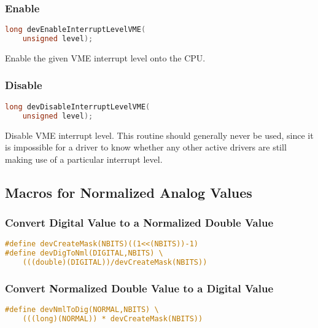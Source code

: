 \subsubsection{Enable}

\begin{lstlisting}[language=C]
long devEnableInterruptLevelVME(
    unsigned level);
\end{lstlisting}

Enable the given VME interrupt level onto the CPU.

\subsubsection{Disable}

\begin{lstlisting}[language=C]
long devDisableInterruptLevelVME(
    unsigned level);
\end{lstlisting}

Disable VME interrupt level. This routine should generally never be used, since it is impossible for a driver to know 
whether any other active drivers are still making use of a particular interrupt level.

\subsection{Macros for Normalized Analog Values}

\subsubsection{Convert Digital Value to a Normalized Double Value}

\begin{lstlisting}[language=C]
#define devCreateMask(NBITS)((1<<(NBITS))-1)
#define devDigToNml(DIGITAL,NBITS) \
    (((double)(DIGITAL))/devCreateMask(NBITS))
\end{lstlisting}

\subsubsection{Convert Normalized Double Value to a Digital Value}

\begin{lstlisting}[language=C]
#define devNmlToDig(NORMAL,NBITS) \
    (((long)(NORMAL)) * devCreateMask(NBITS))
\end{lstlisting}

